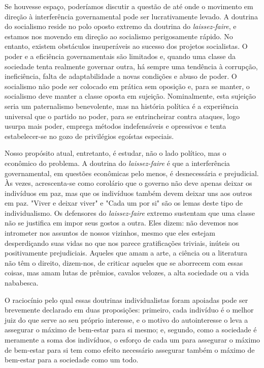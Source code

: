 \documentclass[12pt]{article}
\begin{document}
Se houvesse espaço, poderíamos discutir a questão de até onde o movimento em direção à interferência governamental pode ser lucrativamente levado. A doutrina do socialismo reside no polo oposto extremo da doutrina do \textit{laissez-faire}, e estamos nos movendo em direção ao socialismo perigosamente rápido. No entanto, existem obstáculos insuperáveis ao sucesso dos projetos socialistas. O poder e a eficiência governamentais são limitados e, quando uma classe da sociedade tenta realmente governar outra, há sempre uma tendência à corrupção, ineficiência, falta de adaptabilidade a novas condições e abuso de poder. O socialismo não pode ser colocado em prática sem oposição e, para se manter, o socialismo deve manter a classe oposta em sujeição. Nominalmente, esta sujeição seria um paternalismo benevolente, mas na história política é a experiência universal que o partido no poder, para se entrincheirar contra ataques, logo usurpa mais poder, emprega métodos indefensáveis e opressivos e tenta estabelecer-se no gozo de privilégios egoístas especiais.

Nosso propósito atual, entretanto, é estudar, não o lado político, mas o econômico do problema. A doutrina do \textit{laissez-faire} é que a interferência governamental, em questões econômicas pelo menos, é desnecessária e prejudicial. Às vezes, acrescenta-se como corolário que o governo não deve apenas deixar os indivíduos em paz, mas que os indivíduos também devem deixar uns aos outros em paz. "Viver e deixar viver" e "Cada um por si" são os lemas deste tipo de individualismo. Os defensores do \textit{laissez-faire} extremo sustentam que uma classe não se justifica em impor seus gostos a outra. Eles dizem: não devemos nos intrometer nos assuntos de nossos vizinhos, mesmo que eles estejam desperdiçando suas vidas no que nos parece gratificações triviais, inúteis ou positivamente prejudiciais. Aqueles que amam a arte, a ciência ou a literatura não têm o direito, dizem-nos, de criticar aqueles que se aborrecem com essas coisas, mas amam lutas de prêmios, cavalos velozes, a alta sociedade ou a vida nababesca.

O raciocínio pelo qual essas doutrinas individualistas foram apoiadas pode ser brevemente declarado em duas proposições: primeiro, cada indivíduo é o melhor juiz do que serve ao seu próprio interesse, e o motivo do autointeresse o leva a assegurar o máximo de bem-estar para si mesmo; e, segundo, como a sociedade é meramente a soma dos indivíduos, o esforço de cada um para assegurar o máximo de bem-estar para si tem como efeito necessário assegurar também o máximo de bem-estar para a sociedade como um todo.
\end{document}
